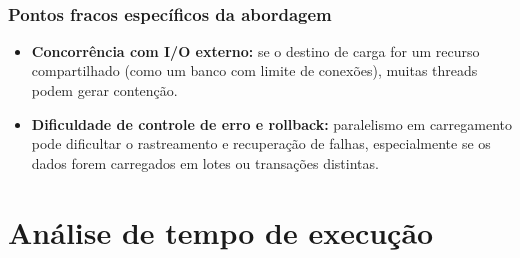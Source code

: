 \documentclass[a4paper,12pt]{article}
\begin{document}
\vspace{1em}

\\
\subsubsection*{Pontos fracos específicos da abordagem}

\begin{itemize}
    \item \textbf{Concorrência com I/O externo:} se o destino de carga for um recurso compartilhado (como um banco com limite de conexões), muitas threads podem gerar contenção.

    \item \textbf{Dificuldade de controle de erro e rollback:} paralelismo em carregamento pode dificultar o rastreamento e recuperação de falhas, especialmente se os dados forem carregados em lotes ou transações distintas.


\end{itemize}

\section{Análise de tempo de execução}
\end{document}
